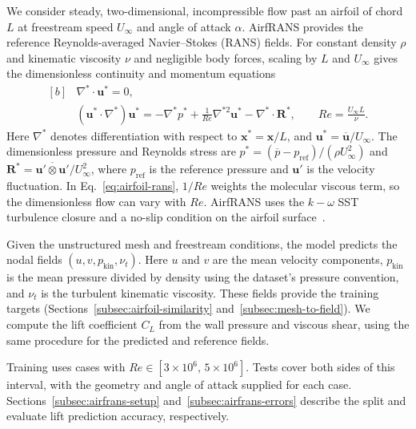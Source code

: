 \documentclass[a4paper,fleqn]{cas-sc}
\begin{document}
We consider steady, two-dimensional, incompressible flow past an airfoil of chord $L$
at freestream speed $U_\infty$ and angle of attack $\alpha$. AirfRANS provides the
reference Reynolds-averaged Navier--Stokes (RANS) fields. For constant density $\rho$
and kinematic viscosity $\nu$ and negligible body forces, scaling by $L$ and $U_\infty$
gives the dimensionless continuity and momentum equations~\citep{Pope2000}
\begin{equation}
  \label{eq:airfoil-rans}
  \begin{aligned}[b]
    &\nabla^*\!\cdot\mathbf{u}^* = 0, \\
    &(\mathbf{u}^*\!\cdot\nabla^*)\mathbf{u}^*
      = -\nabla^*p^*
        + \frac{1}{Re}\nabla^{*2}\mathbf{u}^*
        - \nabla^*\!\cdot\mathbf{R}^*,
        \qquad Re=\frac{U_\infty L}{\nu}.
  \end{aligned}
\end{equation}
Here $\nabla^*$ denotes differentiation with respect to $\mathbf{x}^*=\mathbf{x}/L$, and
$\mathbf{u}^*=\overline{\mathbf{u}}/U_\infty$. The dimensionless pressure and Reynolds
stress are $p^*=(\overline{p}-p_{\mathrm{ref}})/(\rho U_\infty^2)$ and
$\mathbf{R}^*=\overline{\mathbf{u}'\otimes\mathbf{u}'}/U_\infty^2$, where
$p_{\mathrm{ref}}$ is the reference pressure and $\mathbf{u}'$ is the velocity fluctuation.
In Eq.~\eqref{eq:airfoil-rans}, $1/Re$ weights the molecular viscous term, so the
dimensionless flow can vary with $Re$. AirfRANS uses the $k\!-\!\omega$ SST
turbulence closure and a no-slip condition on the airfoil surface~\citep{Bonnet2022AirfRANS}.

Given the unstructured mesh and freestream conditions, the model predicts the nodal
fields $(u,v,p_{\mathrm{kin}},\nu_t)$. Here $u$ and $v$ are the mean velocity components,
$p_{\mathrm{kin}}$ is the mean pressure divided by density using the dataset's pressure
convention, and $\nu_t$ is the turbulent kinematic viscosity. These fields provide the
training targets (Sections~\ref{subsec:airfoil-similarity} and~\ref{subsec:mesh-to-field}).
We compute the lift coefficient $C_L$ from the wall pressure and viscous shear, using
the same procedure for the predicted and reference fields.

Training uses cases with $Re\in[3\times 10^6,\,5\times 10^6]$. Tests cover both sides
of this interval, with the geometry and angle of attack supplied for each case.
Sections~\ref{subsec:airfrans-setup} and~\ref{subsec:airfrans-errors} describe the split
and evaluate lift prediction accuracy, respectively.
\end{document}
